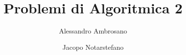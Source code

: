 \documentclass[a4paper, 12pt]{book}
\theoremstyle{plain}
\begin{document}
    \title{Problemi di Algoritmica 2}
    \author{
        Alessandro Ambrosano
        \and
        Jacopo Notarstefano
    }
    
    \maketitle

    
    
    
    
    
    
    
    
    
    
    
    
    
    
    
    
    
    
    
    
\end{document}
